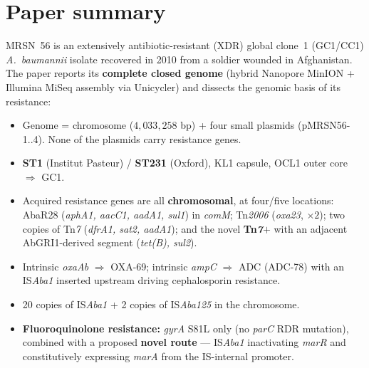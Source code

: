 \documentclass[11pt]{article}
\begin{document}
\section{Paper summary}
MRSN~56 is an extensively antibiotic-resistant (XDR) global clone~1 (GC1/CC1) \emph{A.\ baumannii} isolate recovered in 2010 from a soldier wounded in Afghanistan. The paper reports its \textbf{complete closed genome} (hybrid Nanopore MinION + Illumina MiSeq assembly via Unicycler) and dissects the genomic basis of its resistance:
\begin{itemize}[leftmargin=1.5em]
\item Genome = chromosome ($4{,}033{,}258$ bp) + four small plasmids (pMRSN56-1..4). None of the plasmids carry resistance genes.
\item \textbf{ST1} (Institut Pasteur) / \textbf{ST231} (Oxford), KL1 capsule, OCL1 outer core $\Rightarrow$ GC1.
\item Acquired resistance genes are all \textbf{chromosomal}, at four/five locations: AbaR28 (\emph{aphA1, aacC1, aadA1, sul1}) in \emph{comM}; Tn\emph{2006} (\emph{oxa23}, $\times 2$); two copies of Tn\emph{7} (\emph{dfrA1, sat2, aadA1}); and the novel \textbf{Tn\emph{7$+$}} with an adjacent AbGRI1-derived segment (\emph{tet(B), sul2}).
\item Intrinsic \emph{oxaAb} $\Rightarrow$ OXA-69; intrinsic \emph{ampC} $\Rightarrow$ ADC (ADC-78) with an IS\emph{Aba1} inserted upstream driving cephalosporin resistance.
\item 20 copies of IS\emph{Aba1} + 2 copies of IS\emph{Aba125} in the chromosome.
\item \textbf{Fluoroquinolone resistance:} \emph{gyrA} S81L only (no \emph{parC} RDR mutation), combined with a proposed \textbf{novel route} --- IS\emph{Aba1} inactivating \emph{marR} and constitutively expressing \emph{marA} from the IS-internal promoter.
\end{itemize}
\end{document}
